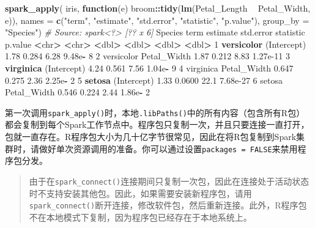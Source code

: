\documentclass[
]{article}
\newenvironment{Shaded}{\begin{snugshade}}{\end{snugshade}}
\newcommand{\CommentTok}[1]{\textcolor[rgb]{0.56,0.35,0.01}{\textit{#1}}}
\newcommand{\ControlFlowTok}[1]{\textcolor[rgb]{0.13,0.29,0.53}{\textbf{#1}}}
\newcommand{\DataTypeTok}[1]{\textcolor[rgb]{0.13,0.29,0.53}{#1}}
\newcommand{\DecValTok}[1]{\textcolor[rgb]{0.00,0.00,0.81}{#1}}
\newcommand{\ErrorTok}[1]{\textcolor[rgb]{0.64,0.00,0.00}{\textbf{#1}}}
\newcommand{\FloatTok}[1]{\textcolor[rgb]{0.00,0.00,0.81}{#1}}
\newcommand{\KeywordTok}[1]{\textcolor[rgb]{0.13,0.29,0.53}{\textbf{#1}}}
\newcommand{\NormalTok}[1]{#1}
\newcommand{\OperatorTok}[1]{\textcolor[rgb]{0.81,0.36,0.00}{\textbf{#1}}}
\newcommand{\StringTok}[1]{\textcolor[rgb]{0.31,0.60,0.02}{#1}}
\begin{document}
\begin{Shaded}
\begin{Highlighting}[]
\KeywordTok{spark_apply}\NormalTok{(}
\NormalTok{iris,}
\ControlFlowTok{function}\NormalTok{(e) broom}\OperatorTok{::}\KeywordTok{tidy}\NormalTok{(}\KeywordTok{lm}\NormalTok{(Petal_Length }\OperatorTok{~}\StringTok{ }\NormalTok{Petal_Width, e)),}
\DataTypeTok{names =} \KeywordTok{c}\NormalTok{(}\StringTok{"term"}\NormalTok{, }\StringTok{"estimate"}\NormalTok{, }\StringTok{"std.error"}\NormalTok{, }\StringTok{"statistic"}\NormalTok{, }\StringTok{"p.value"}\NormalTok{),}
\DataTypeTok{group_by =} \StringTok{"Species"}\NormalTok{)}
\CommentTok{# Source: spark<?> [?? x 6]}
\NormalTok{ Species term estimate std.error statistic p.value}
 \OperatorTok{<}\NormalTok{chr}\OperatorTok{>}\StringTok{ }\ErrorTok{<}\NormalTok{chr}\OperatorTok{>}\StringTok{ }\ErrorTok{<}\NormalTok{dbl}\OperatorTok{>}\StringTok{ }\ErrorTok{<}\NormalTok{dbl}\OperatorTok{>}\StringTok{ }\ErrorTok{<}\NormalTok{dbl}\OperatorTok{>}\StringTok{ }\ErrorTok{<}\NormalTok{dbl}\OperatorTok{>}
\DecValTok{1} \KeywordTok{versicolor}\NormalTok{ (Intercept) }\FloatTok{1.78} \FloatTok{0.284} \FloatTok{6.28} \FloatTok{9.48}\NormalTok{e}\OperatorTok{-}\StringTok{ }\DecValTok{8}
\DecValTok{2}\NormalTok{ versicolor Petal_Width }\FloatTok{1.87} \FloatTok{0.212} \FloatTok{8.83} \FloatTok{1.27e-11}
\DecValTok{3} \KeywordTok{virginica}\NormalTok{ (Intercept) }\FloatTok{4.24} \FloatTok{0.561} \FloatTok{7.56} \FloatTok{1.04}\NormalTok{e}\OperatorTok{-}\StringTok{ }\DecValTok{9}
\DecValTok{4}\NormalTok{ virginica Petal_Width }\FloatTok{0.647} \FloatTok{0.275} \FloatTok{2.36} \FloatTok{2.25}\NormalTok{e}\OperatorTok{-}\StringTok{ }\DecValTok{2}
\DecValTok{5} \KeywordTok{setosa}\NormalTok{ (Intercept) }\FloatTok{1.33} \FloatTok{0.0600} \FloatTok{22.1} \FloatTok{7.68e-27}
\DecValTok{6}\NormalTok{ setosa Petal_Width }\FloatTok{0.546} \FloatTok{0.224} \FloatTok{2.44} \FloatTok{1.86}\NormalTok{e}\OperatorTok{-}\StringTok{ }\DecValTok{2}
\end{Highlighting}
\end{Shaded}

第一次调用\texttt{spark\_apply()}时，本地\texttt{.libPaths()}中的所有内容（包含所有R包）都会复制到每个Spark工作节点中。程序包只复制一次，并且只要连接一直打开，包就一直存在。R程序包大小为几十亿字节很常见，因此在将R包复制到Spark集群时，请做好单次资源调用的准备。你可以通过设置\texttt{packages\ =\ FALSE}来禁用程序包分发。

\begin{quote}
由于在\texttt{spark\_connect()}连接期间只复制一次包，因此在连接处于活动状态时不支持安装其他包。因此，如果需要安装新程序包，请用\texttt{spark\_connect()}断开连接，修改软件包，然后重新连接。此外，R程序包不在本地模式下复制，因为程序包已经存在于本地系统上。
\end{quote}
\end{document}

